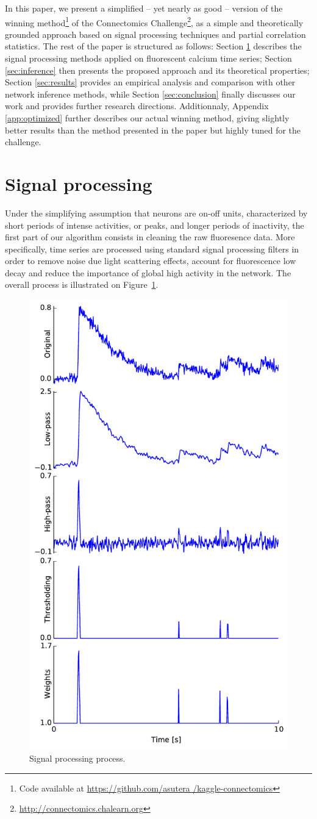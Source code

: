 \documentclass[wcp]{jmlr}
\begin{document}
In this paper, we present a simplified -- yet nearly as good -- version of
the winning method\footnote{Code available at \url{https://github.com/asutera
/kaggle-connectomics}} of the Connectomics
Challenge\footnote{\url{http://connectomics.chalearn.org}}, as a simple and
theoretically grounded approach based on signal processing techniques and
partial correlation statistics. The rest of the paper is structured as
follows: Section \ref{sec:filter} describes the signal processing methods
applied on fluorescent calcium time series; Section \ref{sec:inference} then
presents the proposed approach and its theoretical properties; Section
\ref{sec:results} provides an empirical analysis and comparison with other
network inference methods, while Section \ref{sec:conclusion} finally
discusses our work and provides further research directions. Additionnaly, Appendix
\ref{app:optimized} further describes our actual winning method, giving slightly
better results than the method presented in the paper but highly tuned for the
challenge.


\section{Signal processing} \label{sec:filter}

Under the simplifying assumption that neurons are on-off units, characterized
by short periods of intense activities, or peaks, and longer periods of
inactivity, the first part of our algorithm consists in cleaning the raw
fluoresence data. More specifically, time series are processed using standard
signal processing filters in order to remove noise due light scattering
effects, account for fluorescence  low decay and reduce the importance of
global high activity in the network. The overall process is illustrated on
Figure~\ref{fig:filtered-signal}.

\begin{figure}
\centering
\includegraphics[width=0.4\linewidth]{images/fig_filtering}
\caption{Signal processing process.}
\label{fig:filtered-signal}
\end{figure}
\end{document}
